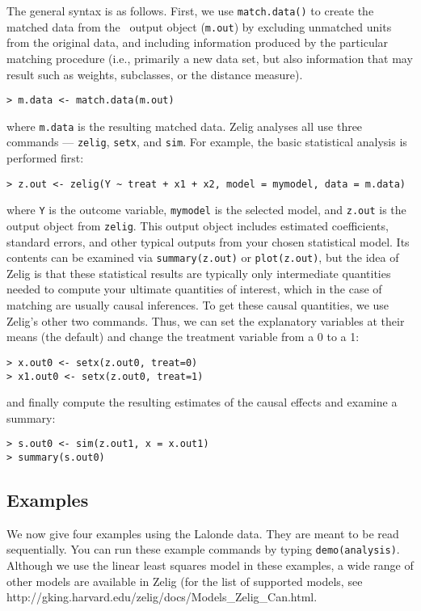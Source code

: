 The general syntax is as follows. First, we use \texttt{match.data()}
to create the matched data from the \MatchIt\ output object
(\texttt{m.out}) by excluding unmatched units from the original data,
and including information produced by the particular matching
procedure (i.e., primarily a new data set, but also information that
may result such as weights, subclasses, or the distance measure).
\begin{verbatim}
> m.data <- match.data(m.out)
\end{verbatim}
where {\tt m.data} is the resulting matched data.  Zelig analyses all
use three commands --- \texttt{zelig}, \texttt{setx}, and
\texttt{sim}.  For example, the basic statistical analysis is
performed first:
\begin{verbatim}
> z.out <- zelig(Y ~ treat + x1 + x2, model = mymodel, data = m.data)
\end{verbatim}
where {\tt Y} is the outcome variable, {\tt mymodel} is the selected
model, and {\tt z.out} is the output object from {\tt zelig}.  This
output object includes estimated coefficients, standard errors, and
other typical outputs from your chosen statistical model.  Its
contents can be examined via \texttt{summary(z.out)} or
\texttt{plot(z.out)}, but the idea of Zelig is that these statistical
results are typically only intermediate quantities needed to compute
your ultimate quantities of interest, which in the case of matching
are usually causal inferences.  To get these causal quantities, we use
Zelig's other two commands.  Thus, we can set the explanatory
variables at their means (the default) and change the treatment
variable from a 0 to a 1:
\begin{verbatim}
> x.out0 <- setx(z.out0, treat=0)
> x1.out0 <- setx(z.out0, treat=1)
\end{verbatim}
and finally compute the resulting estimates of the causal effects and
examine a summary:
\begin{verbatim}
> s.out0 <- sim(z.out1, x = x.out1)
> summary(s.out0)
\end{verbatim}

\subsection{Examples}

We now give four examples using the Lalonde data.  They are meant to
be read sequentially.  You can run these example commands by typing
{\tt demo(analysis)}.  Although we use the linear least squares model
in these examples, a wide range of other models are available in Zelig
(for the list of supported models, see
{http://gking.harvard.edu/zelig/docs/Models_Zelig_Can.html}.

